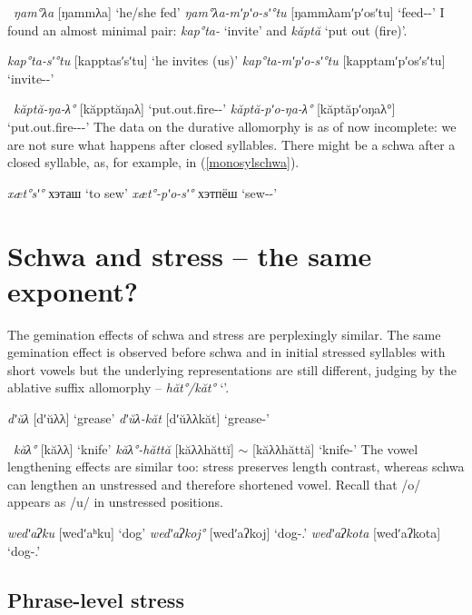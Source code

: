 \documentclass[a4paper, 12pt]{article}
\begin{document}
	\pex~\label{schwaodd}\a \emph{ŋam°λa} [ŋammλa] \hfill `he/she fed'		
		\a \emph{ŋam°λa-mʹpʹo-sʹ°tu} [ŋammλamʹpʹosʹtu] \hfill `feed-{\Dur}-{\Hab}'
	\xe
	I found an almost minimal pair: \emph{kap°ta-} `invite' and \emph{kăptă} `put out (fire)'.
	
	\pex\label{}\a \emph{kap°ta-sʹ°tu} [kapptasʹsʹtu] \hfill `he invites (us)'
		\a \emph{kap°ta-mʹpʹo-sʹ°tu} [kapptamʹpʹosʹsʹtu] \hfill `invite-{\Dur}-{\Hab}'
	\xe
	
	\pex~\label{}\a \emph{kăptă-ŋa-λ°} [kăpptăŋaλ] \hfill `put.out.fire-{\Gfs}-{\Tsg}'
		\a\label{}\emph{kăptă-pʹo-ŋa-λ°} [kăptăpʹoŋaλ°] \hfill `put.out.fire-{\Dur}-{\Gfs}-{\Tsg}'
	\xe
	The data on the durative allomorphy is as of now incomplete: we are not sure what happens after closed syllables. There might be a schwa after a closed syllable, as, for example, in (\ref{monosylschwa}).
	
	\pex\label{}\a \emph{xæt°sʹ°} хэташ \hfill `to sew'
		\a \emph{xæt°-pʹo-sʹ°} хэтпёш \hfill `sew-{\Dur}-{\Ptcp}'\\ \hfill \parencite{barmich-vello}
	\xe
	
%		
		\section{Schwa and stress -- the same exponent?}
		
	The gemination effects of schwa and stress are perplexingly similar. The same gemination effect is observed before schwa and in initial stressed syllables with short vowels but the underlying representations are still different, judging by the ablative suffix allomorphy -- \emph{hăt°/kăt°} `{\Abl}'.
	
	\pex\label{}\a \emph{dʹŭλ} [dʹŭλλ] \hfill `grease'
		\a \emph{dʹŭλ-kăt} [dʹŭλλkăt] \hfill `grease-{\Abl}'
	\xe
	
	\pex~\label{}\a \emph{kăλ°} [kăλλ] \hfill `knife'
		\a \emph{kăλ°-hăttă} [kăλλhăttĭ] $\sim$ [kăλλhăttă] \hfill `knife-{\Abl}'
	\xe
	The vowel lengthening effects are similar too: stress preserves length contrast, whereas schwa can lengthen an unstressed and therefore shortened vowel. Recall that /o/ appears as /u/ in unstressed positions.
	
	\pex\label{}\a \emph{wedʹaʔku} [wedʹaʰku] \hfill `dog'
		\a \emph{wedʹaʔkoj°} [wedʹaʔkoj] \hfill `dog-{\Poss}.{\Fsg}'
		\a \emph{wedʹaʔkota} [wedʹaʔkota] \hfill `dog-{\Poss}.{\Tsg}'
	\xe
	
		\subsection{Phrase-level stress}
			
\end{document}
